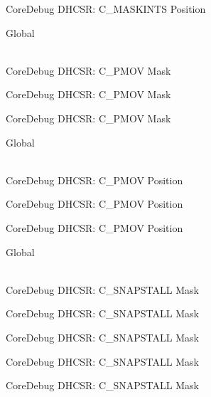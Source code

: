 \begin{DoxyRefList}
\label{deprecated__deprecated000586}%
%
Core\+Debug DHCSR\+: C\+\_\+\+MASKINTS Position  
\item[{\parbox[t]{\linewidth}{Global \doxylink{group___c_m_s_i_s___s_c_b_ga6c41fddb98d97a17f3e9020278a1aed1}{Core\+Debug\+\_\+\+DHCSR\+\_\+\+C\+\_\+\+PMOV\+\_\+\+Msk} }}]\hfill \\
\label{deprecated__deprecated000030}%
%
Core\+Debug DHCSR\+: C\+\_\+\+PMOV Mask 

\label{deprecated__deprecated000481}%
%
Core\+Debug DHCSR\+: C\+\_\+\+PMOV Mask 

\label{deprecated__deprecated000583}%
%
Core\+Debug DHCSR\+: C\+\_\+\+PMOV Mask  
\item[{\parbox[t]{\linewidth}{Global \doxylink{group___c_m_s_i_s___s_c_b_gac414659dd5c8bd9c91ab94441ded720a}{Core\+Debug\+\_\+\+DHCSR\+\_\+\+C\+\_\+\+PMOV\+\_\+\+Pos} }}]\hfill \\
\label{deprecated__deprecated000029}%
%
Core\+Debug DHCSR\+: C\+\_\+\+PMOV Position 

\label{deprecated__deprecated000480}%
%
Core\+Debug DHCSR\+: C\+\_\+\+PMOV Position 

\label{deprecated__deprecated000582}%
%
Core\+Debug DHCSR\+: C\+\_\+\+PMOV Position  
\item[{\parbox[t]{\linewidth}{Global \doxylink{group___c_m_s_i_s___core_debug_ga53aa99b2e39a67622f3b9973e079c2b4}{Core\+Debug\+\_\+\+DHCSR\+\_\+\+C\+\_\+\+SNAPSTALL\+\_\+\+Msk} }}]\hfill \\
\label{deprecated__deprecated000032}%
%
Core\+Debug DHCSR\+: C\+\_\+\+SNAPSTALL Mask 

\label{deprecated__deprecated000176}%
%
Core\+Debug DHCSR\+: C\+\_\+\+SNAPSTALL Mask 

\label{deprecated__deprecated000318}%
%
Core\+Debug DHCSR\+: C\+\_\+\+SNAPSTALL Mask 

\label{deprecated__deprecated000394}%
%
Core\+Debug DHCSR\+: C\+\_\+\+SNAPSTALL Mask 

\label{deprecated__deprecated000483}%
%
Core\+Debug DHCSR\+: C\+\_\+\+SNAPSTALL Mask 


\end{DoxyRefList}
